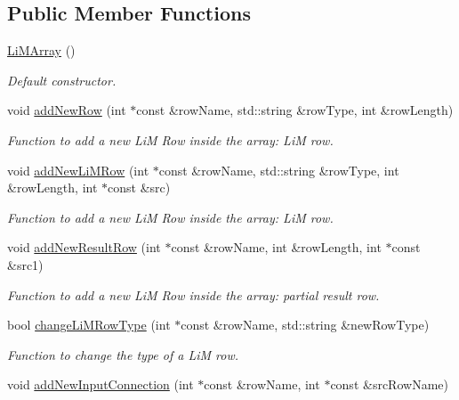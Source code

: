 \subsection*{Public Member Functions}
\begin{DoxyCompactItemize}
\item 
\hyperlink{classoctantis_1_1LiMArray_a135b6437641126fff154d8d779232387}{Li\+M\+Array} ()
\begin{DoxyCompactList}\small\item\em Default constructor. \end{DoxyCompactList}\item 
void \hyperlink{classoctantis_1_1LiMArray_a6c300ff9df7342e8593e2db9f265cbd2}{add\+New\+Row} (int $\ast$const \&row\+Name, std\+::string \&row\+Type, int \&row\+Length)
\begin{DoxyCompactList}\small\item\em Function to add a new LiM Row inside the array\+: LiM row. \end{DoxyCompactList}\item 
void \hyperlink{classoctantis_1_1LiMArray_a3c9c115f7ea64d10b10bb8be669e98ad}{add\+New\+Li\+M\+Row} (int $\ast$const \&row\+Name, std\+::string \&row\+Type, int \&row\+Length, int $\ast$const \&src)
\begin{DoxyCompactList}\small\item\em Function to add a new LiM Row inside the array\+: LiM row. \end{DoxyCompactList}\item 
void \hyperlink{classoctantis_1_1LiMArray_a37a3335b4bdddc1e7c8fc5a2de5ec226}{add\+New\+Result\+Row} (int $\ast$const \&row\+Name, int \&row\+Length, int $\ast$const \&src1)
\begin{DoxyCompactList}\small\item\em Function to add a new LiM Row inside the array\+: partial result row. \end{DoxyCompactList}\item 
bool \hyperlink{classoctantis_1_1LiMArray_acc1bcd7ac09e11848c885a116ae18d8c}{change\+Li\+M\+Row\+Type} (int $\ast$const \&row\+Name, std\+::string \&new\+Row\+Type)
\begin{DoxyCompactList}\small\item\em Function to change the type of a LiM row. \end{DoxyCompactList}\item 
void \hyperlink{classoctantis_1_1LiMArray_a9732e49054f17cb15d68729c26b3fc21}{add\+New\+Input\+Connection} (int $\ast$const \&row\+Name, int $\ast$const \&src\+Row\+Name)

\end{DoxyCompactItemize}
